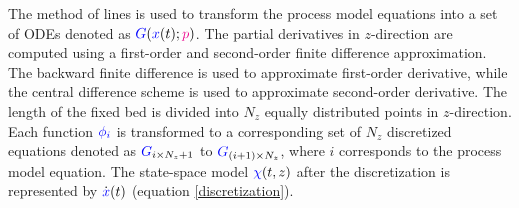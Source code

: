 \documentclass[../Article_Model_Parameters.tex]{subfiles}
\begin{document}
		The method of lines is used to transform the process model equations into a set of ODEs denoted as ${\color{blue}G}({\color{blue}x}(t);{\color{magenta}p})$. The partial derivatives in $z$-direction are computed using a first-order and second-order finite difference approximation. The backward finite difference is used to approximate first-order derivative, while the central difference scheme is used to approximate second-order derivative. The length of the fixed bed is divided into $N_z$ equally distributed points in $z$-direction. Each function ${\color{blue}\phi_i}$ is transformed to a corresponding set of $N_z$ discretized equations denoted as ${\color{blue}G}_{i\times N_z+1}$ to ${\color{blue}G}_{(i+1)\times N_z}$, where $i$ corresponds to the process model equation. The state-space model ${\color{blue}\chi}(t,z)$ after the discretization is represented by $\dot{{\color{blue}x}}(t)$ (equation  \ref{discretization}).
			
\end{document}
